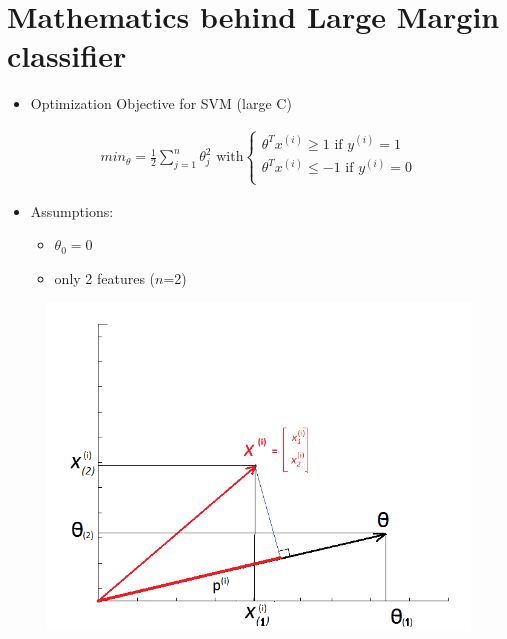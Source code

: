 \documentclass[a4paper,12pt]{report}
\begin{document}
\section{Mathematics behind Large Margin classifier}
\begin{itemize}
\item Optimization Objective for SVM (large C)
\end{itemize}

\begin{align}
min_{\theta} = \frac{1}{2} \sum_{j=1} ^n \theta_j ^2 \text{ \ with}
\begin{cases}
    \theta^T x^{(i)} \geq 1  \text{\ if $y^{(i)}=1$}\\
    \theta^T x^{(i)} \leq -1  \text{\ if $y^{(i)}=0$}\\
  \end{cases}
\end{align}

\begin{itemize}
\item Assumptions: 
\begin{itemize}
\item $\theta_0 = 0$ 
\item only 2 features ($n$=2)
\end{itemize}
\end{itemize}

\begin{figure}[H]
	\centering
        \includegraphics[totalheight=4 cm]{vectorsxtheta.png}\caption{}
\end{figure}
\end{document}
